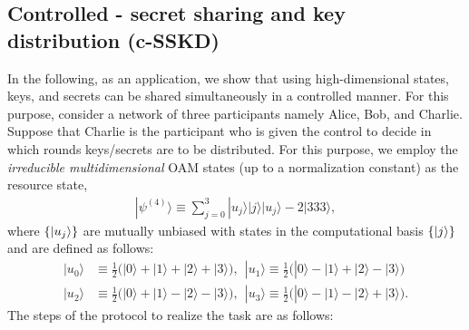 \documentclass[fleqn,10pt]{wlscirep}
\begin{document}
\subsection*{Controlled - secret sharing and key distribution (c-SSKD)}
\hypertarget{controlled-secret sharing and key distribution}{}
In the following, as an application, we show that using high-dimensional states, keys, and secrets can be shared simultaneously in a controlled manner. For this purpose, consider a network of three participants namely Alice, Bob, and Charlie. Suppose that Charlie is the participant who is given the control to decide in which rounds keys/secrets are to be distributed.
For this purpose, we employ the \textit{irreducible multidimensional} OAM states (up to a normalization constant) as the resource state, 
\begin{align}    |\psi^{(4)}\rangle\equiv\sum_{j=0}^3|u_j\rangle|j\rangle|u_j\rangle-2|333\rangle,
\end{align}
where $\{\ket{u_j}\}$ are mutually unbiased with states in the computational basis $\{\ket{j}\}$ and are defined as follows:
\begin{align}
    |u_0\rangle &\equiv \frac{1}{2}\Big(|0\rangle+|1\rangle+|2\rangle+|3\rangle\Big),~~ |u_1\rangle \equiv \frac{1}{2}\Big(|0\rangle-|1\rangle+|2\rangle-|3\rangle\Big)\nonumber\\
    |u_2\rangle &\equiv \frac{1}{2}\Big(|0\rangle+|1\rangle-|2\rangle-|3\rangle\Big),~~
    |u_3\rangle \equiv \frac{1}{2}\Big(|0\rangle-|1\rangle-|2\rangle+|3\rangle\Big).
\end{align}
The steps of the protocol to realize the task are as follows:
\end{document}
